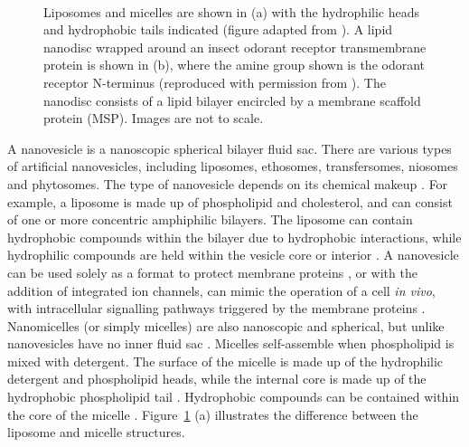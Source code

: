 \documentclass[
  a4paper,
]{scrbook}
\begin{document}
\begin{figure}
\begin{minipage}[t]{0.36\linewidth}
{{}

}

\end{minipage}%
%
\begin{minipage}[t]{0.01\linewidth}

{\centering 

~

}

\end{minipage}%

\caption[Diagrams showing the structure of various artificial
membranes.]{\label{fig-membranes}Liposomes and micelles are shown in (a)
with the hydrophilic heads and hydrophobic tails indicated (figure
adapted from \autocite{Micelle}). A lipid nanodisc wrapped around an
insect odorant receptor transmembrane protein is shown in (b), where the
amine group shown is the odorant receptor N-terminus (reproduced with
permission from \autocite{Murugathas2019a}). The nanodisc consists of a
lipid bilayer encircled by a membrane scaffold protein (MSP). Images are
not to scale.}

\end{figure}

A nanovesicle is a nanoscopic spherical bilayer fluid sac. There are
various types of artificial nanovesicles, including liposomes,
ethosomes, transfersomes, niosomes and phytosomes. The type of
nanovesicle depends on its chemical makeup \autocite{Ramadon2022}. For
example, a liposome is made up of phospholipid and cholesterol, and can
consist of one or more concentric amphiphilic bilayers. The liposome can
contain hydrophobic compounds within the bilayer due to hydrophobic
interactions, while hydrophilic compounds are held within the vesicle
core or interior \autocite{Nath2007,Ramadon2022}. A nanovesicle can be
used solely as a format to protect membrane proteins
\autocite{Murugathas2020}, or with the addition of integrated ion
channels, can mimic the operation of a cell \emph{in vivo}, with
intracellular signalling pathways triggered by the membrane proteins
\autocite{Lim2015}. Nanomicelles (or simply micelles) are also
nanoscopic and spherical, but unlike nanovesicles have no inner fluid
sac \autocite{Nath2007,Bose2021}. Micelles self-assemble when
phospholipid is mixed with detergent. The surface of the micelle is made
up of the hydrophilic detergent and phospholipid heads, while the
internal core is made up of the hydrophobic phospholipid tail
\autocite{Nath2007}. Hydrophobic compounds can be contained within the
core of the micelle \autocite{Bose2021}. Figure~\ref{fig-membranes} (a)
illustrates the difference between the liposome and micelle structures.
\end{document}
